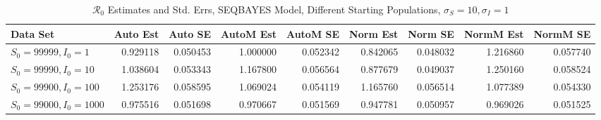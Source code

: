 \documentclass[12pt]{article}
\newcommand{\rr}{\ensuremath{\mathcal{R}_0}}
\begin{document}
\begin{table}[H]
	
	\caption{$\rr$ Estimates and Std. Errs, SEQBAYES Model,
		Different Starting Populations, 
		$\sigma_S = 10, \sigma_I = 1$}
	\begin{footnotesize}
		\hskip -1.7cm
	\begin{tabular}{l|r|r|r|r|r|r|r|r}
		\hline
		Data Set & Auto Est & Auto SE & AutoM Est & AutoM SE & Norm Est & Norm SE & NormM Est & NormM SE\\
		\hline
		$S_0 = 99999, I_0 = 1$ & 0.929118 & 0.050453 & 1.000000 & 0.052342 & 0.842065 & 0.048032 & 1.216860 & 0.057740\\
		\hline
		$S_0 = 99990, I_0 = 10$ & 1.038604 & 0.053343 & 1.167800 & 0.056564 & 0.877679 & 0.049037 & 1.250160 & 0.058524\\
		\hline
		$S_0 = 99900, I_0 = 100$ & 1.253176 & 0.058595 & 1.069024 & 0.054119 & 1.165760 & 0.056514 & 1.077389 & 0.054330\\
		\hline
		$S_0 = 99000, I_0 = 1000$ & 0.975516 & 0.051698 & 0.970667 & 0.051569 & 0.947781 & 0.050957 & 0.969026 & 0.051525\\
		\hline
	\end{tabular}
\end{footnotesize}
\end{table}
\end{document}
